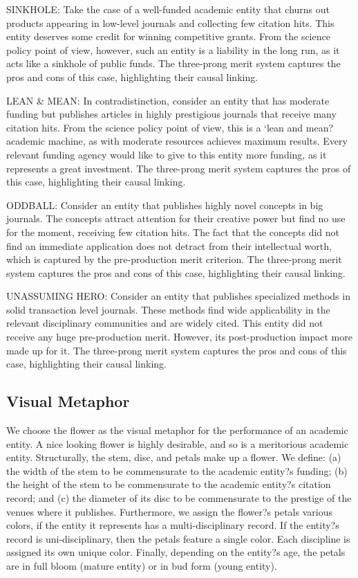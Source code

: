 SINKHOLE: Take the case of a well-funded academic entity that churns out products appearing in low-level journals and collecting few citation hits. This entity deserves some credit for winning competitive grants. From the science policy point of view, however, such an entity is a liability in the long run, as it acts like a sinkhole of public funds. The three-prong merit system captures the pros and cons of this case, highlighting their causal linking.

LEAN & MEAN: In contradistinction, consider an entity that has moderate funding but publishes articles in highly prestigious journals that receive many citation hits. From the science policy point of view, this is a `lean and mean? academic machine, as with moderate resources achieves maximum results. Every relevant funding agency would like to give to this entity more funding, as it represents a great investment. The three-prong merit system captures the pros of this case, highlighting their causal linking.

ODDBALL: Consider an entity that publishes highly novel concepts in big journals. The concepts attract attention for their creative power but find no use for the moment, receiving few citation hits. The fact that the concepts did not find an immediate application does not detract from their intellectual worth, which is captured by the pre-production merit criterion. The three-prong merit system captures the pros and cons of this case, highlighting their causal linking.

UNASSUMING HERO: Consider an entity that publishes specialized methods in solid transaction level journals. These methods find wide applicability in the relevant disciplinary communities and are widely cited. This entity did not receive any huge pre-production merit. However, its post-production impact more made up for it. The three-prong merit system captures the pros and cons of this case, highlighting their causal linking.



\subsection {Visual Metaphor}

We choose the flower as the visual metaphor for the performance of an academic entity. A nice looking flower is highly desirable, and so is a meritorious academic entity. Structurally, the stem, disc, and petals make up a flower. We define: (a) the width of the stem to be commensurate to the academic entity?s funding; (b) the height of the stem to be commensurate to the academic entity?s citation record; and (c) the diameter of its disc to be commensurate to the prestige of the venues where it publishes. Furthermore, we assign the flower?s petals various colors, if the entity it represents has a multi-disciplinary record. If the entity?s record is uni-disciplinary, then the petals feature a single color. Each discipline is assigned its own unique color. Finally, depending on the entity?s age, the petals are in full bloom (mature entity) or in bud form (young entity).

